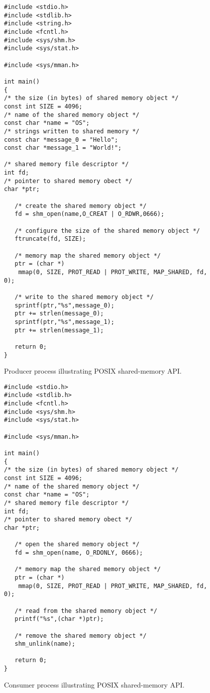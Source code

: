 \begin{figure}[h!]
\centering
\begin{verbatim}
#include <stdio.h>
#include <stdlib.h>
#include <string.h>
#include <fcntl.h>
#include <sys/shm.h>
#include <sys/stat.h>
 
#include <sys/mman.h>
 
int main()
{
/* the size (in bytes) of shared memory object */
const int SIZE = 4096;
/* name of the shared memory object */
const char *name = "OS";
/* strings written to shared memory */
const char *message_0 = "Hello";
const char *message_1 = "World!";
 
/* shared memory file descriptor */
int fd;
/* pointer to shared memory obect */
char *ptr;
 
   /* create the shared memory object */
   fd = shm_open(name,O_CREAT | O_RDWR,0666);
 
   /* configure the size of the shared memory object */
   ftruncate(fd, SIZE);
 
   /* memory map the shared memory object */
   ptr = (char *)
    mmap(0, SIZE, PROT_READ | PROT_WRITE, MAP_SHARED, fd, 0);
 
   /* write to the shared memory object */
   sprintf(ptr,"%s",message_0);
   ptr += strlen(message_0);
   sprintf(ptr,"%s",message_1);
   ptr += strlen(message_1);
 
   return 0;
}
\end{verbatim}
\caption{Producer process illustrating POSIX shared-memory API.}\label{fig:producer-posix-shm}
\end{figure}

\begin{figure}[h!]
\centering
\begin{verbatim}
#include <stdio.h>
#include <stdlib.h>
#include <fcntl.h>
#include <sys/shm.h>
#include <sys/stat.h>
 
#include <sys/mman.h>
 
int main()
{
/* the size (in bytes) of shared memory object */
const int SIZE = 4096;
/* name of the shared memory object */
const char *name = "OS";
/* shared memory file descriptor */
int fd;
/* pointer to shared memory obect */
char *ptr;
 
   /* open the shared memory object */
   fd = shm_open(name, O_RDONLY, 0666);
 
   /* memory map the shared memory object */
   ptr = (char *)
    mmap(0, SIZE, PROT_READ | PROT_WRITE, MAP_SHARED, fd, 0);
 
   /* read from the shared memory object */
   printf("%s",(char *)ptr);
 
   /* remove the shared memory object */
   shm_unlink(name);
 
   return 0;
}
\end{verbatim}
\caption{Consumer process illustrating POSIX shared-memory API.}\label{fig:consumer-posix-shm}
\end{figure}

